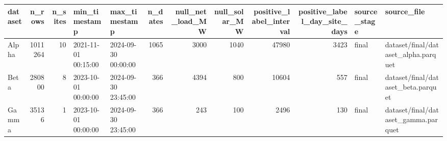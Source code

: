 \begin{tabular}{lrrllrrrrrll}
\toprule
dataset & n_rows & n_sites & min_timestamp & max_timestamp & n_dates & null_net_load_MW & null_solar_MW & positive_label_interval & positive_label_day_site_days & source_stage & source_file \\
\midrule
Alpha & 1011264 & 10 & 2021-11-01 00:15:00 & 2024-09-30 00:00:00 & 1065 & 3000 & 1040 & 47980 & 3423 & final & dataset/final/dataset_alpha.parquet \\
Beta & 280800 & 8 & 2023-10-01 00:00:00 & 2024-09-30 23:45:00 & 366 & 4394 & 800 & 10604 & 557 & final & dataset/final/dataset_beta.parquet \\
Gamma & 35136 & 1 & 2023-10-01 00:00:00 & 2024-09-30 23:45:00 & 366 & 243 & 100 & 2496 & 130 & final & dataset/final/dataset_gamma.parquet \\
\bottomrule
\end{tabular}
